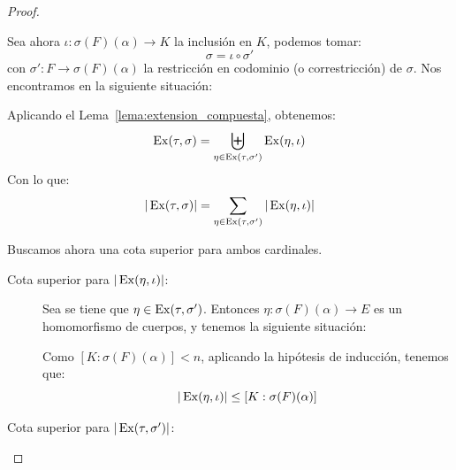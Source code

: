 \begin{prop}[Extensión II]
\begin{proof}
\begin{itemize}
                Sea ahora $\iota:\sigma(F)(\alpha)\to K$ la inclusión en $K$, podemos tomar:
                \begin{equation*}
                    \sigma = \iota \circ \sigma'
                \end{equation*}
                con $\sigma':F\to \sigma(F)(\alpha)$ la restricción en codominio (o correstricción) de $\sigma$. Nos encontramos en la siguiente situación:
                \begin{figure}[H]
                    \centering
                \end{figure}
                \noindent
                Aplicando el Lema~\ref{lema:extension_compuesta}, obtenemos:
                \begin{equation*}
                    \operatorname{Ex}(\tau,\sigma) = \biguplus_{\eta \in \operatorname{Ex}(\tau,\sigma')}\operatorname{Ex}(\eta, \iota)
                \end{equation*}
                Con lo que:
                \begin{equation*}
                    |\operatorname{Ex}(\tau,\sigma)| = \sum_{\eta \in  \operatorname{Ex}(\tau, \sigma')}|\operatorname{Ex}(\eta,\iota)|
                \end{equation*}

                Buscamos ahora una cota superior para ambos cardinales.
                \begin{description}
                    \item [Cota superior para $|\operatorname{Ex}(\eta,\iota)|$:] Sea se tiene que $\eta\in \operatorname{Ex}(\tau,\sigma')$. Entonces $\eta:\sigma(F)(\alpha)\to E$ es un homomorfismo de cuerpos, y tenemos la siguiente situación:
                    \begin{figure}[H]
                        \centering
                    \end{figure}
                    Como $[K:\sigma(F)(\alpha)] < n$, aplicando la hipótesis de inducción, tenemos que:
                        \begin{equation*}
                            |\operatorname{Ex}(\eta,\iota)| \leq [K:\sigma(F)(\alpha)]
                        \end{equation*}
                    \item [Cota superior para $|\operatorname{Ex}(\tau,\sigma')|$:]
                    

\end{description}
\end{itemize}
\end{proof}
\end{prop}
